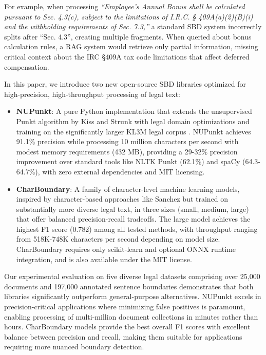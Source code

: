 For example, when processing \textit{``Employee's Annual Bonus shall be calculated pursuant to Sec. 4.3(c), subject to the limitations of I.R.C. § 409A(a)(2)(B)(i) and the withholding requirements of Sec. 7.3,''} a standard SBD system incorrectly splits after ``Sec. 4.3'', creating multiple fragments. When queried about bonus calculation rules, a RAG system would retrieve only partial information, missing critical context about the IRC §409A tax code limitations that affect deferred compensation.

In this paper, we introduce two new open-source SBD libraries optimized for high-precision, high-throughput processing of legal text:
\\
\begin{itemize}
    \item \textbf{NUPunkt}: A pure Python implementation that extends the unsupervised Punkt algorithm by Kiss and Strunk \cite{kiss2006unsupervised} with legal domain optimizations and training on the significantly larger KL3M legal corpus \cite{kl3m-data}. NUPunkt achieves 91.1\% precision while processing 10 million characters per second with modest memory requirements (432 MB), providing a 29-32\% precision improvement over standard tools like NLTK Punkt (62.1\%) and spaCy (64.3-64.7\%), with zero external dependencies and MIT licensing.
    \\
    \item \textbf{CharBoundary}: A family of character-level machine learning models, inspired by character-based approaches like Sanchez \cite{sanchez2019sentence} but trained on substantially more diverse legal text, in three sizes (small, medium, large) that offer balanced precision-recall tradeoffs. The large model achieves the highest F1 score (0.782) among all tested methods, with throughput ranging from 518K-748K characters per second depending on model size. CharBoundary requires only scikit-learn and optional ONNX runtime integration, and is also available under the MIT license.
    \\
\end{itemize}

Our experimental evaluation on five diverse legal datasets comprising over 25,000 documents and 197,000 annotated sentence boundaries demonstrates that both libraries significantly outperform general-purpose alternatives. NUPunkt excels in precision-critical applications where minimizing false positives is paramount, enabling processing of multi-million document collections in minutes rather than hours. CharBoundary models provide the best overall F1 scores with excellent balance between precision and recall, making them suitable for applications requiring more nuanced boundary detection.

